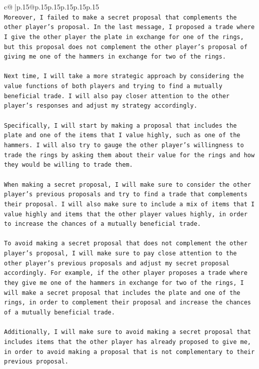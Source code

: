 \documentclass{article}
\begin{document}
{\begin{supertabular}{c@{$\;$}|p{.15\linewidth}@{}p{.15\linewidth}p{.15\linewidth}p{.15\linewidth}p{.15\linewidth}p{.15\linewidth}}
{{{\\ 
\texttt{Moreover, I failed to make a secret proposal that complements the other player's proposal. In the last message, I proposed a trade where I give the other player the plate in exchange for one of the rings, but this proposal does not complement the other player's proposal of giving me one of the hammers in exchange for two of the rings.} \\
\\ 
\texttt{Next time, I will take a more strategic approach by considering the value functions of both players and trying to find a mutually beneficial trade. I will also pay closer attention to the other player's responses and adjust my strategy accordingly.} \\
\\ 
\texttt{Specifically, I will start by making a proposal that includes the plate and one of the items that I value highly, such as one of the hammers. I will also try to gauge the other player's willingness to trade the rings by asking them about their value for the rings and how they would be willing to trade them.} \\
\\ 
\texttt{When making a secret proposal, I will make sure to consider the other player's previous proposals and try to find a trade that complements their proposal. I will also make sure to include a mix of items that I value highly and items that the other player values highly, in order to increase the chances of a mutually beneficial trade.} \\
\\ 
\texttt{To avoid making a secret proposal that does not complement the other player's proposal, I will make sure to pay close attention to the other player's previous proposals and adjust my secret proposal accordingly. For example, if the other player proposes a trade where they give me one of the hammers in exchange for two of the rings, I will make a secret proposal that includes the plate and one of the rings, in order to complement their proposal and increase the chances of a mutually beneficial trade.} \\
\\ 
\texttt{Additionally, I will make sure to avoid making a secret proposal that includes items that the other player has already proposed to give me, in order to avoid making a proposal that is not complementary to their previous proposal.} \\
\\ 
\\ 
}}}
\end{supertabular}}
\end{document}
